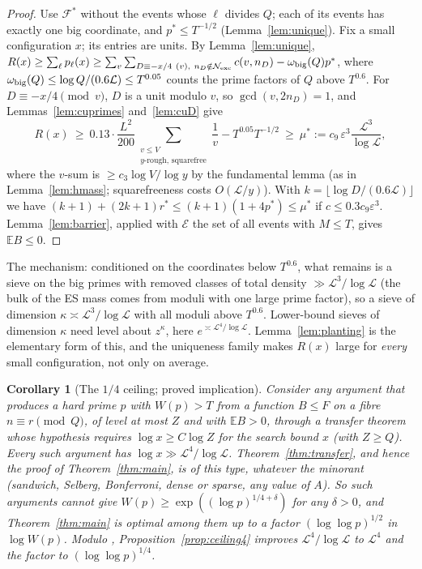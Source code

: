 \documentclass[11pt,reqno]{amsart}
\newtheorem{corollary}[theorem]{Corollary}
\theoremstyle{definition}
\newcommand{\Lc}{\mathcal L}
\newcommand{\E}{\mathbb E}
\begin{document}
\begin{proof}
Use $\mathcal F^*$ without the events whose $\ell$ divides $Q$; each of its events
has exactly one big coordinate, and $p^*\le T^{-1/2}$ (Lemma~\ref{lem:unique}).
Fix a small configuration $x$; its entries are units.  By
Lemma~\ref{lem:unique},
$R(x)\ge\sum_\ell p_\ell(x)\ge\sum_v\sum_{D\equiv-x/4\ (v),\ n_D\notin\mathcal N_{\rm exc}}c(v,n_D)-\omega_{\rm big}(Q)p^*$, where $\omega_{\rm big}(Q)\le\log Q/(0.6\Lc)\le T^{0.05}$ counts the prime factors of $Q$ above $T^{0.6}$.
For $D\equiv-x/4\pmod v$, $D$ is a unit modulo $v$, so $\gcd(v,2n_D)=1$, and
Lemmas~\ref{lem:cuprimes} and~\ref{lem:cuD} give
\[
 R(x)\ \ge\ 0.13\cdot\frac{L^2}{200}\sum_{\substack{v\le V\\ y\text{-rough, squarefree}}}\frac1v-T^{0.05}T^{-1/2}\ \ge\ \mu^*:=c_9\,\varepsilon^3\frac{\Lc^3}{\log\Lc},
\]
where the $v$-sum is $\ge c_3\log V/\log y$ by the fundamental lemma (as in
Lemma~\ref{lem:hmass}; squarefreeness costs $O(\Lc/y)$).  With
$k=\lfloor\log D/(0.6\Lc)\rfloor$ we have $(k+1)+(2k+1)r^*\le(k+1)(1+4p^*)\le\mu^*$ if
$c\le0.3c_9\varepsilon^3$.  Lemma~\ref{lem:barrier}, applied with $\mathcal E$ the set of
all events with $M\le T$, gives $\E B\le0$.
\end{proof}

The mechanism: conditioned on the coordinates below $T^{0.6}$, what remains
is a sieve on the big primes with removed classes of total density
$\gg\Lc^3/\log\Lc$ (the bulk of the ES mass comes from moduli with one large
prime factor), so a sieve of dimension $\kappa\asymp\Lc^3/\log\Lc$ with all moduli
above $T^{0.6}$.  Lower-bound sieves of dimension $\kappa$ need level about
$z^{\kappa}$, here $e^{\asymp\Lc^4/\log\Lc}$.  Lemma~\ref{lem:planting} is the elementary
form of this, and the uniqueness family makes $R(x)$ large for \emph{every}
small configuration, not only on average.

\begin{corollary}[The $1/4$ ceiling; proved implication]\label{cor:ceiling}
Consider any argument that produces a hard prime $p$ with $W(p)>T$ from a
function $B\le F$ on a fibre $n\equiv r\pmod Q$, of level at most $Z$ and with
$\E B>0$, through a transfer theorem whose hypothesis requires
$\log x\ge C\log Z$ for the search bound $x$ (with $Z\ge Q$).  Every such
argument has $\log x\gg\Lc^4/\log\Lc$.  Theorem~\ref{thm:transfer}, and hence
the proof of Theorem~\ref{thm:main}, is of this type, whatever the minorant
(sandwich, Selberg, Bonferroni, dense or sparse, any value of $A$).  So such
arguments cannot give $W(p)\ge\exp((\log p)^{1/4+\delta})$ for any $\delta>0$, and
Theorem~\ref{thm:main} is optimal among them up to a factor
$(\log\log p)^{1/2}$ in $\log W(p)$.  Modulo \cite{TQ}, Proposition~\ref{prop:ceiling4}
improves $\Lc^4/\log\Lc$ to $\Lc^4$ and the factor to $(\log\log p)^{1/4}$.
\end{corollary}
\end{document}
